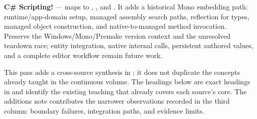 \begin{itemize}
  \textbf{C\# Scripting!} --- maps to , , and . It adds a historical Mono embedding path: runtime/app-domain setup, managed assembly search paths, reflection for types, managed object construction, and native-to-managed method invocation. Preserve the Windows/Mono/Premake version context and the unresolved teardown race; entity integration, native internal calls, persistent authored values, and a complete editor workflow remain future work.
\end{itemize}

This pass adds a cross-source synthesis in ; it does not duplicate the concepts already taught in the continuous volume. The headings below are exact headings in  and identify the existing teaching that already covers each source's core. The additions note contributes the narrower observations recorded in the third column: boundary failures, integration paths, and evidence limits.

